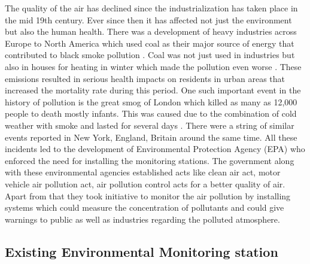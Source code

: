 The quality of the air has declined since the industrialization has taken place in the mid 19th century. Ever since then it has affected not just the environment but also the human health. There was a development of heavy industries across Europe to North America which used coal as their major source of energy that contributed to black smoke pollution \cite{Heidorn1978} \cite{Timothy}. Coal was not just used in industries but also in houses for heating in winter which made the pollution even worse \cite{Al2016}. These emissions resulted in serious health impacts on residents in urban areas that increased the mortality rate during this period. One such important event in the history of pollution is the great smog of London which killed as many as 12,000 people to death mostly infants. This was caused due to the combination of cold weather with smoke and lasted for several days \cite{londonfog}. There were a string of similar events reported in New York, England, Britain around the same time. All these incidents led to the development of Environmental Protection Agency (EPA) who enforced the need for installing the monitoring stations. The government along with these environmental agencies established acts like clean air act, motor vehicle air pollution act, air pollution control acts for a better quality of air\cite{airpollutionact}. Apart from that they took initiative to monitor the air pollution by installing systems which could measure the concentration of pollutants and could give warnings to public as well as industries regarding the  polluted atmosphere.


\subsection{Existing Environmental Monitoring station}

